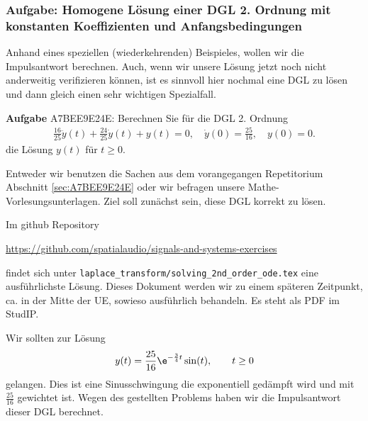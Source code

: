 \subsubsection{Aufgabe: Homogene Lösung einer DGL 2. Ordnung mit konstanten
Koeffizienten und Anfangsbedingungen}
\label{sec:A7BEE9E24E_Aufgabe}
\begin{Ziel}
Anhand eines speziellen (wiederkehrenden) Beispieles, wollen wir die Impulsantwort berechnen. Auch,
wenn wir unsere Lösung jetzt noch nicht anderweitig verifizieren können,
ist es sinnvoll hier nochmal eine DGL zu lösen und dann gleich einen sehr wichtigen
Spezialfall.
\end{Ziel}
\textbf{Aufgabe} {\tiny A7BEE9E24E}: Berechnen Sie für die DGL 2. Ordnung
\begin{align}
\frac{16}{25} \ddot{y}(t) + \frac{24}{25} \dot{y}(t) + y(t) = 0,
\quad \dot{y}(0)=\frac{25}{16}, \quad y(0)=0.
\end{align}
die Lösung $y(t)$ für $t\geq 0$.
\begin{Werkzeug}
Entweder wir benutzen die Sachen aus dem vorangegangen Repetitorium Abschnitt
\ref{sec:A7BEE9E24E} oder
wir befragen unsere Mathe-Vorlesungsunterlagen. Ziel soll zunächst sein, diese
DGL korrekt zu lösen.
\end{Werkzeug}
\begin{Ansatz}
Im github Repository

\url{https://github.com/spatialaudio/signals-and-systems-exercises}

findet sich unter \verb|laplace_transform/solving_2nd_order_ode.tex| eine
ausführlichste Lösung.
Dieses Dokument werden wir zu einem späteren Zeitpunkt, ca. in der Mitte der
UE, sowieso ausführlich behandeln. Es steht als PDF im StudIP.
\end{Ansatz}
\begin{Loesung}
Wir sollten zur Lösung
\begin{align}
y(t) = \frac{25}{16} \e^{-\frac{3}{4} t} \sin(t), \qquad t\geq 0
\end{align}
gelangen.
%
Dies ist eine Sinusschwingung die exponentiell gedämpft wird und mit
$\frac{25}{16}$ gewichtet ist.
Wegen des gestellten Problems haben wir die Impulsantwort dieser DGL berechnet.
\end{Loesung}
